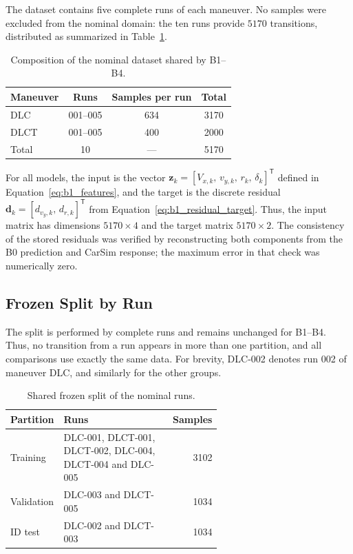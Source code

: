 \documentclass[12pt,a4paper]{report}
\begin{document}
The dataset contains five complete runs of each maneuver. No samples were excluded from the nominal domain: the ten runs provide $5170$ transitions, distributed as summarized in Table~\ref{tab:common_dataset}.

\begin{table}[htbp]
    \centering
    \caption{Composition of the nominal dataset shared by B1--B4.}
    \label{tab:common_dataset}
    \begin{tabular}{@{}lccc@{}}
        \toprule
        Maneuver & Runs & Samples per run & Total \\
        \midrule
        DLC  & 001--005 & 634 & 3170 \\
        DLCT & 001--005 & 400 & 2000 \\
        \midrule
        Total & 10 & --- & 5170 \\
        \bottomrule
    \end{tabular}
\end{table}

For all models, the input is the vector $\mathbf{z}_k=[V_{x,k},\,v_{y,k},\,r_k,\,\delta_k]^{\mathsf T}$ defined in Equation~\eqref{eq:b1_features}, and the target is the discrete residual $\mathbf{d}_k=[d_{v_y,k},\,d_{r,k}]^{\mathsf T}$ from Equation~\eqref{eq:b1_residual_target}. Thus, the input matrix has dimensions $5170\times4$ and the target matrix $5170\times2$. The consistency of the stored residuals was verified by reconstructing both components from the B0 prediction and CarSim response; the maximum error in that check was numerically zero.

\subsection{Frozen Split by Run}

The split is performed by complete runs and remains unchanged for B1--B4. Thus, no transition from a run appears in more than one partition, and all comparisons use exactly the same data. For brevity, DLC-002 denotes run 002 of maneuver DLC, and similarly for the other groups.

\begin{table}[htbp]
    \centering
    \caption{Shared frozen split of the nominal runs.}
    \label{tab:common_frozen_split}
    \begin{tabular}{@{}lp{0.61\linewidth}r@{}}
        \toprule
        Partition & Runs & Samples \\
        \midrule
        Training
            & DLC-001, DLCT-001, DLCT-002, DLC-004, DLCT-004 and DLC-005
            & 3102 \\
        Validation
            & DLC-003 and DLCT-005
            & 1034 \\
        ID test
            & DLC-002 and DLCT-003
            & 1034 \\
        \bottomrule
    \end{tabular}
\end{table}
\end{document}

